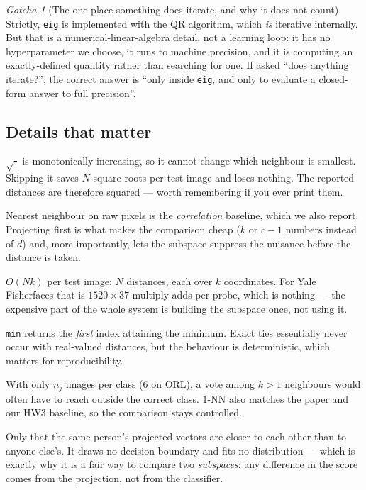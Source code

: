 \documentclass[11pt]{article}
\theoremstyle{definition}
\theoremstyle{remark}
\newtheorem*{gotcha}{Gotcha}
\begin{document}
\begin{gotcha}[The one place something does iterate, and why it does not count]
Strictly, \texttt{eig} is implemented with the QR algorithm, which \emph{is}
iterative internally. But that is a numerical-linear-algebra detail, not a
learning loop: it has no hyperparameter we choose, it runs to machine precision,
and it is computing an exactly-defined quantity rather than searching for one.
If asked ``does anything iterate?'', the correct answer is ``only inside
\texttt{eig}, and only to evaluate a closed-form answer to full precision''.
\end{gotcha}

\subsection{Details that matter}

\begin{description}[leftmargin=*,style=nextline]
\item[Why squared distance and no square root.]
  $\sqrt{\cdot}$ is monotonically increasing, so it cannot change which neighbour
  is smallest. Skipping it saves $N$ square roots per test image and loses
  nothing. The reported distances are therefore squared --- worth remembering if
  you ever print them.
\item[Why Euclidean distance in the projected space, and not in pixel space.]
  Nearest neighbour on raw pixels is the \emph{correlation} baseline, which we
  also report. Projecting first is what makes the comparison cheap ($k$ or $c-1$
  numbers instead of $d$) and, more importantly, lets the subspace suppress the
  nuisance before the distance is taken.
\item[Cost.]
  $O(Nk)$ per test image: $N$ distances, each over $k$ coordinates. For Yale
  Fisherfaces that is $1520\times37$ multiply-adds per probe, which is nothing ---
  the expensive part of the whole system is building the subspace once, not using
  it.
\item[Ties.]
  \texttt{min} returns the \emph{first} index attaining the minimum. Exact ties
  essentially never occur with real-valued distances, but the behaviour is
  deterministic, which matters for reproducibility.
\item[Why $1$-NN and not $k$-NN.]
  With only $n_j$ images per class ($6$ on ORL), a vote among $k>1$ neighbours
  would often have to reach outside the correct class. $1$-NN also matches the
  paper and our HW3 baseline, so the comparison stays controlled.
\item[What 1-NN assumes.]
  Only that the same person's projected vectors are closer to each other than to
  anyone else's. It draws no decision boundary and fits no distribution --- which
  is exactly why it is a fair way to compare two \emph{subspaces}: any difference
  in the score comes from the projection, not from the classifier.
\end{description}
\end{document}
